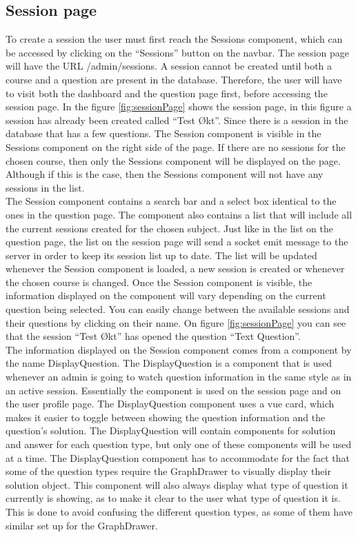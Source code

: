 \subsection{Session page}
To create a session the user must first reach the Sessions component, which can be accessed by clicking on the “Sessions” button on the navbar. The session page will have the URL /admin/sessions. A session cannot be created until both a course and a question are present in the database. Therefore, the user will have to visit both the dashboard and the question page first, before accessing the session page. In the figure \ref{fig:sessionPage} shows the session page, in this figure a session has already been created called “Test Økt”. Since there is a session in the database that has a few questions. The Session component is visible in the Sessions component on the right side of the page. If there are no sessions for the chosen course, then only the Sessions component will be displayed on the page. Although if this is the case, then the Sessions component will not have any sessions in the list.
\\[11pt]
The Session component contains a search bar and a select box identical to the ones in the question page. The component also contains a list that will include all the current sessions created for the chosen subject. Just like in the list on the question page, the list on the session page will send a socket emit message to the server in order to keep its session list up to date. The list will be updated whenever the Session component is loaded, a new session is created or whenever the chosen course is changed. Once the Session component is visible, the information displayed on the component will vary depending on the current question being selected. You can easily change between the available sessions and their questions by clicking on their name. On figure \ref{fig:sessionPage} you can see that the session “Test Økt” has opened the question “Text Question”. 
\\[11pt]
The information displayed on the Session component comes from a component by the name DisplayQuestion. The DisplayQuestion is a component that is used whenever an admin is going to watch question information in the same style as in an active session. Essentially the component is used on the session page and on the user profile page. The DisplayQuestion component uses a vue card, which makes it easier to toggle between showing the question information and the question’s solution.  The DisplayQuestion will contain components for solution and answer for each question type, but only one of these components will be used at a time. The DisplayQuestion component has to accommodate for the fact that some of the question types require the GraphDrawer to visually display their solution object. This component will also always display what type of question it currently is showing, as to make it clear to the user what type of question it is. This is done to avoid confusing the different question types, as some of them have similar set up for the GraphDrawer.
